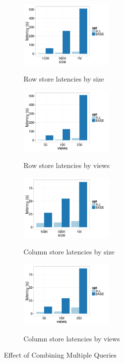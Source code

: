 \begin{figure}[t]
	\centering
	\begin{subfigure}{0.24\linewidth}
		\centering
		{\includegraphics[width=4.6cm] {Images/row_all_none_by_size.pdf}}
		\caption{Row store latencies by size}
		\label{fig:row_all_none_size}
	\end{subfigure}
	\begin{subfigure}{0.24\linewidth}
		\centering
		{\includegraphics[width=4.6cm] {Images/row_all_none_by_views.pdf}}
		\caption{Row store latencies by views}
		\label{fig:row_all_none_views}
	\end{subfigure}
	\begin{subfigure}{0.24\linewidth}
		\centering
		{\includegraphics[width=4.6cm] {Images/col_all_none_by_size.pdf}}
		\caption{Column store latencies by size}
		\label{fig:col_all_none_size}
	\end{subfigure}
	\begin{subfigure}{0.24\linewidth}
		\centering
		{\includegraphics[width=4.6cm] {Images/col_all_none_by_views.pdf}}
		\caption{Column store latencies by views}
		\label{fig:col_all_none_views}
	\end{subfigure}
	\vspace{-10pt}
	\caption{Effect of Combining Multiple Queries}
	\label{fig:all_opt}
	\vspace{-10pt}
\end{figure}


